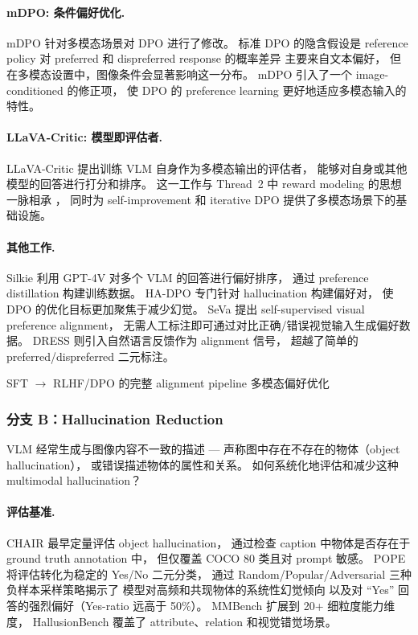 \paragraph{mDPO: 条件偏好优化.}
mDPO \cite{wang2024mdpo} 针对多模态场景对 DPO 进行了修改。
标准 DPO 的隐含假设是 reference policy 对 preferred 和 dispreferred response 的概率差异
主要来自文本偏好，
但在多模态设置中，图像条件会显著影响这一分布。
mDPO 引入了一个 image-conditioned 的修正项，
使 DPO 的 preference learning 更好地适应多模态输入的特性。

\paragraph{LLaVA-Critic: 模型即评估者.}
LLaVA-Critic \cite{xiong2024llava-critic} 提出训练 VLM 自身作为多模态输出的评估者，
能够对自身或其他模型的回答进行打分和排序。
这一工作与 Thread~2 中 reward modeling 的思想一脉相承
，
同时为 self-improvement 和 iterative DPO 提供了多模态场景下的基础设施。

\paragraph{其他工作.}
Silkie \cite{li2023silkie} 利用 GPT-4V 对多个 VLM 的回答进行偏好排序，
通过 preference distillation 构建训练数据。
HA-DPO \cite{zhao2023hadpo} 专门针对 hallucination 构建偏好对，
使 DPO 的优化目标更加聚焦于减少幻觉。
SeVa \cite{zhu2024seva} 提出 self-supervised visual preference alignment，
无需人工标注即可通过对比正确/错误视觉输入生成偏好数据。
DRESS \cite{chen2023dress} 则引入自然语言反馈作为 alignment 信号，
超越了简单的 preferred/dispreferred 二元标注。

  {SFT $\rightarrow$ RLHF/DPO 的完整 alignment pipeline}
  {多模态偏好优化}

\subsubsection{分支 B：Hallucination Reduction}
\label{sec:t5-branch-b}

\begin{problembox}
VLM 经常生成与图像内容不一致的描述 --- 声称图中存在不存在的物体（object hallucination），
或错误描述物体的属性和关系。
如何系统化地评估和减少这种 multimodal hallucination？
\end{problembox}

\paragraph{评估基准.}
CHAIR \cite{rohrbach2018chair} 最早定量评估 object hallucination，
通过检查 caption 中物体是否存在于 ground truth annotation 中，
但仅覆盖 COCO 80 类且对 prompt 敏感。
POPE \cite{li2023pope} 将评估转化为稳定的 Yes/No 二元分类，
通过 Random/Popular/Adversarial 三种负样本采样策略揭示了
模型对高频和共现物体的系统性幻觉倾向
以及对 ``Yes'' 回答的强烈偏好（Yes-ratio 远高于 50\%）。
MMBench \cite{liu2023mmbench} 扩展到 20+ 细粒度能力维度，
HallusionBench \cite{guan2023hallusionbench} 覆盖了 attribute、relation 和视觉错觉场景。

